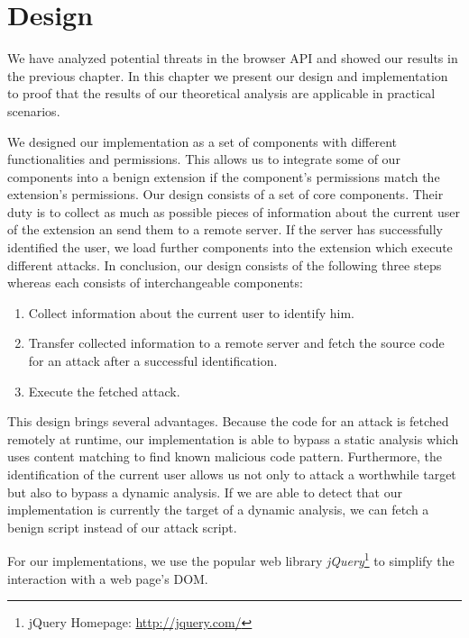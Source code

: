 
\chapter{Design}

	We have analyzed potential threats in the browser API and showed our results in the previous chapter. In this chapter we present our design and implementation to proof that the results of our theoretical analysis are applicable in practical scenarios. 
	
	We designed our implementation as a set of components with different functionalities and permissions. This allows us to integrate some of our components into a benign extension if the component's permissions match the extension's permissions. Our design consists of a set of core components. Their duty is to collect as much as possible pieces of information about the current user of the extension an send them to a remote server. If the server has successfully identified the user, we load further components into the extension which execute different attacks. In conclusion, our design consists of the following three steps whereas each consists of interchangeable components:
	
	\begin{enumerate}
		\item Collect information about the current user to identify him.
		\item Transfer collected information to a remote server and fetch the source code for an attack after a successful identification.
		\item Execute the fetched attack.
	\end{enumerate}
	
	This design brings several advantages. Because the code for an attack is fetched remotely at runtime, our implementation is able to bypass a static analysis which uses content matching to find known malicious code pattern. Furthermore, the identification of the current user allows us not only to attack a worthwhile target but also to bypass a dynamic analysis. If we are able to detect that our implementation is currently the target of a dynamic analysis, we can fetch a benign script instead of our attack script. 

	For our implementations, we use the popular web library \textit{jQuery}\footnote{jQuery Homepage: \url{http://jquery.com/}} to simplify the interaction with a web page's DOM. 



